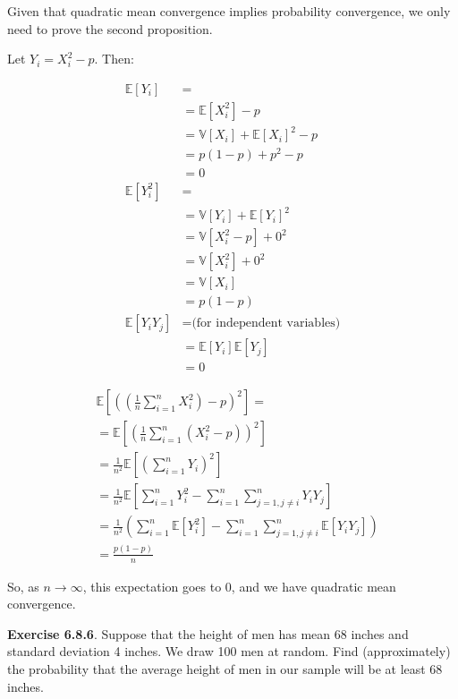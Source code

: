 Given that quadratic mean convergence implies probability convergence,
we only need to prove the second proposition.

Let \(Y_i = X_i^2 - p\). Then:

\begin{align}
\mathbb{E}[Y_i] & = \\
& = \mathbb{E}[X_i^2] - p \\
& = \mathbb{V}[X_i] + \mathbb{E}[X_i]^2 - p \\
& = p(1-p) + p^2 - p \\
& = 0 \\
\mathbb{E}[Y_i^2] & = \\
& = \mathbb{V}[Y_i] + \mathbb{E}[Y_i]^2 \\
& = \mathbb{V}[X_i^2 - p] + 0^2 \\
& = \mathbb{V}[X_i^2] + 0^2 \\
& = \mathbb{V}[X_i]\\
& = p(1-p) \\
\mathbb{E}[Y_i Y_j] & = \text{(for independent variables)}\\
& = \mathbb{E}[Y_i] \mathbb{E}[Y_j] \\
& = 0
\end{align}

\begin{align}
& \mathbb{E}\left[\left(\left(\frac{1}{n} \sum_{i=1}^n X_i^2\right) - p\right)^2\right] = \\
& = \mathbb{E}\left[\left(\frac{1}{n} \sum_{i=1}^n \left(X_i^2 - p\right)\right)^2\right] \\
& = \frac{1}{n^2} \mathbb{E}\left[\left(\sum_{i=1}^n Y_i\right)^2\right] \\
& = \frac{1}{n^2} \mathbb{E}\left[\sum_{i=1}^n Y_i^2 - \sum_{i=1}^n \sum_{j=1, j \neq i}^n Y_i Y_j\right] \\
& = \frac{1}{n^2} \left( \sum_{i=1}^n \mathbb{E}\left[Y_i^2\right] - \sum_{i=1}^n \sum_{j=1, j \neq i}^n \mathbb{E}\left[ Y_i Y_j \right] \right) \\
& = \frac{p(1-p)}{n}
\end{align}

So, as \(n \rightarrow \infty\), this expectation goes to 0, and we have
quadratic mean convergence.

\textbf{Exercise 6.8.6}. Suppose that the height of men has mean 68
inches and standard deviation 4 inches. We draw 100 men at random. Find
(approximately) the probability that the average height of men in our
sample will be at least 68 inches.

